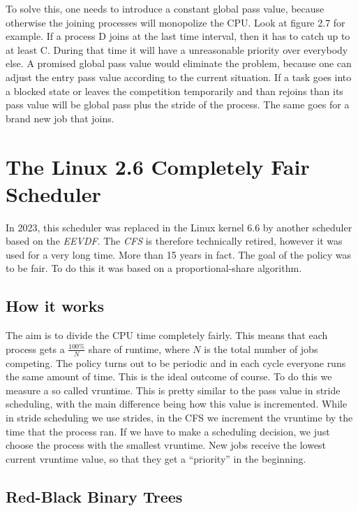 To solve this, one needs to introduce a constant global pass value, because otherwise the joining processes will monopolize the CPU. 
Look at figure 2.7 for example.
If a process D joins at the last time interval, then it has to catch up to at least C. During that time it will have a unreasonable priority over everybody else.
A promised global pass value would eliminate the problem, because one can adjust the entry pass value according to the current situation.
If a task goes into a blocked state or leaves the competition temporarily and than rejoins than its pass value will be global pass plus the stride of the process. The same goes for a brand new job that joins.

\newpage

\section{The Linux 2.6 Completely Fair Scheduler}

In 2023, this scheduler was replaced in the Linux kernel 6.6 by another scheduler based on the \emph{EEVDF}.
The \emph{CFS} is therefore technically retired, however it was used for a very long time. More than 15 years in fact.
The goal of the policy was to be fair. To do this it was based on a proportional-share algorithm.

\subsection{How it works}

The aim is to divide the CPU time completely fairly.
This means that each process gets a $\frac{100\%}{N}$ share of runtime, where $N$ is the total number of jobs competing.
The policy turns out to be periodic and in each cycle everyone runs the same amount of time. 
This is the ideal outcome of course.
To do this we measure a so called vruntime.
This is pretty similar to the pass value in stride scheduling, with the main difference being how this value is incremented.
While in stride scheduling we use strides, in the CFS we increment the vruntime by the time that the process ran.
If we have to make a scheduling decision, we just choose the process with the smallest vruntime.
New jobs receive the lowest current vruntime value, so that they get a ``priority'' in the beginning.

\subsection{Red-Black Binary Trees} \label{sec:rb-tree}

